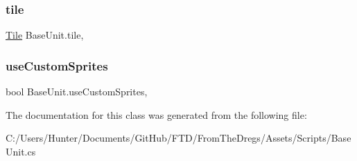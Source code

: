 \subsubsection{\texorpdfstring{tile}{tile}}
{\footnotesize\ttfamily \mbox{\hyperlink{class_tile}{Tile}} Base\+Unit.\+tile\hspace{0.3cm}{\ttfamily [get]}, {\ttfamily [set]}}

\mbox{\label{class_base_unit_a6c81f225b4030b9f4d21f410f9667047}} 
\subsubsection{\texorpdfstring{useCustomSprites}{useCustomSprites}}
{\footnotesize\ttfamily bool Base\+Unit.\+use\+Custom\+Sprites\hspace{0.3cm}{\ttfamily [get]}, {\ttfamily [set]}}



The documentation for this class was generated from the following file\+:\begin{DoxyCompactItemize}
\item 
C\+:/\+Users/\+Hunter/\+Documents/\+Git\+Hub/\+F\+T\+D/\+From\+The\+Dregs/\+Assets/\+Scripts/Base\+Unit.\+cs\end{DoxyCompactItemize}
